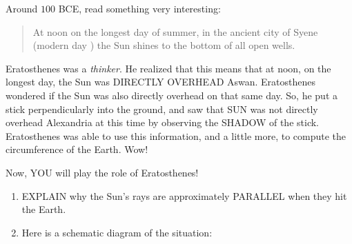 \documentclass[noauthor,nooutcomes,handout]{ximera}
\begin{document}
\begin{question}
  Around $100$ BCE,  read something very interesting:
  \begin{quote}
    At noon on the longest day of summer, in the ancient city of Syene
    (modern day ) the
    Sun shines to the bottom of all open wells.
  \end{quote}
  Eratosthenes was a \textit{thinker}. He realized that this means
  that at noon, on the longest day, the Sun was DIRECTLY OVERHEAD
  Aswan. Eratosthenes wondered if the Sun was also directly overhead
   on that
  same day. So, he put a stick perpendicularly into the ground, and
  saw that SUN was not directly overhead Alexandria at this time by
  observing the SHADOW of the stick. Eratosthenes was able to use this
  information, and a little more, to compute the circumference of the
  Earth. Wow!



  Now, YOU will play the role of Eratosthenes!
  \begin{enumerate}
  \item EXPLAIN why the Sun's rays are approximately PARALLEL when they hit the Earth.
  \item Here is a schematic diagram of the situation:
    \begin{center}
\end{center}
\end{enumerate}
\end{question}
\end{document}
